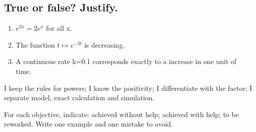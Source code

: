 \subsection*{True or false? Justify.}\label{C09-VF}
\begin{enumerate}
\item $e^{2x}=2e^x$ for all x.
\item The function $t\mapsto e^{-3t}$ is decreasing.
\item A continuous rate k=\num{0,1} corresponds exactly to a  increase in one unit of time.
\end{enumerate}
\begin{keypoint}I keep the rules for powers; I know the positivity; I differentiate with the factor; I separate model, exact calculation and simulation.

For each objective, indicate: achieved without help; achieved with help; to be reworked. Write one example and one mistake to avoid.\end{keypoint}
\endgroup
\ifmxteacher{}\fi
